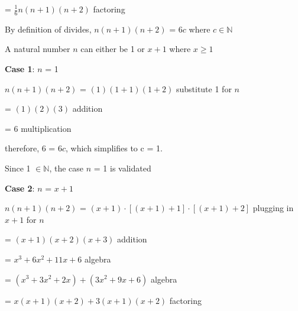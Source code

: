 \documentclass{article} %
\begin{document}
    \vspace*{0.08cm}

    \tabto*{2.57cm} = $\frac{1}{6}n(n + 1)(n + 2)$ \tabto*{6cm}factoring
    
    \vspace*{0.08cm}

    By definition of divides, $n(n + 1)(n + 2)$ = 6$c$ where $c \in \mathbb{N}$

    A natural number $n$ can either be 1 or $x+1$ where $x \geq 1$

    \vspace*{0.2cm}

    \textbf{Case 1}: $n$ = 1

    \tabto*{1cm}$n(n + 1)(n + 2)$ = $(1)(1 + 1)(1 + 2)$ \tabto*{7.3cm}substitute 1 for $n$

    \vspace*{0.08cm}

    \tabto*{1cm}\tabto*{3.51cm} = $(1)(2)(3)$ \tabto*{7.3cm}addition
    
    \vspace*{0.08cm}

    \tabto*{1cm}\tabto*{3.51cm} = $6$ \tabto*{7.3cm}multiplication
    
    \vspace*{0.08cm}

    \tabto*{1cm}therefore, 6 = 6$c$, which simplifies to c = 1.

    \tabto*{1cm}Since 1 $\in \mathbb{N}$, the case $n$ = 1 is validated

    \vspace*{0.2cm}
    
    \textbf{Case 2}: $n$ = $x + 1$
    \vspace*{0.08cm}

    \tabto*{1cm}$n(n + 1)(n + 2)$ = $(x + 1)\cdot [(x + 1) + 1]\cdot [(x + 1) + 2]$ \tabto*{9.6cm}plugging in $x+1$ for $n$
    \vspace*{0.08cm}

    \tabto*{3.51cm} = $(x + 1)(x + 2)(x + 3)$ \tabto*{9.6cm}addition
    \vspace*{0.08cm}

    \tabto*{3.51cm} = $x^3 + 6x^2 + 11x + 6$ \tabto*{9.6cm}algebra
    \vspace*{0.08cm}

    \tabto*{3.51cm} = $(x^3 +3x^2 + 2x) + (3x^2 + 9x + 6)$ \tabto*{9.6cm}algebra
    \vspace*{0.08cm}

    \tabto*{3.51cm} = $x(x+1)(x+2) + 3(x+1)(x+2)$ \tabto*{9.6cm}factoring
    \vspace*{0.08cm}
\end{document}
